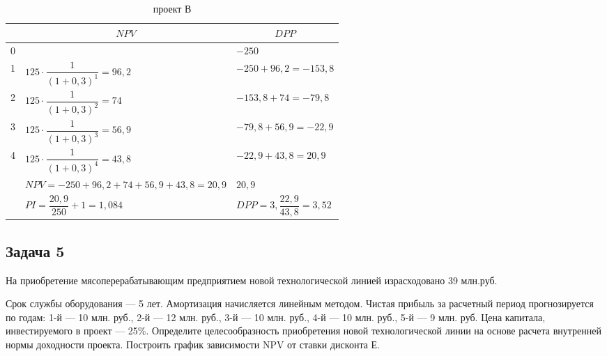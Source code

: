 \begin{table}[!h]
	\caption{проект В}
	\small
	\setlength{\extrarowheight}{2.7mm}
	\begin{tabularx}{\textwidth}{|K{1.55cm}|p{5cm}|p{5cm}|}
		\hline
		&                     &  \\  &                                                                     &  $    -250   $                 \\  & $125 \cdot \dfrac{1}{(1+0,3)^1} = 96,2$ &$ -250 +96,2   =-153,8     $            \\  & $125 \cdot \dfrac{1}{(1+0,3)^2} = 74$    & $-153,8  +74=-79,8      $           \\  & $125 \cdot \dfrac{1}{(1+0,3)^3} = 56,9$ &$-79,8  +56,9=-22,9    $             \\  & $125 \cdot \dfrac{1}{(1+0,3)^4} =43,8$  & $-22,9 +43,8= 20,9     $                \\ \hline
		&$NPV = -250+96,2+74+56,9+43,8=20,9$     & $20,9 $                     \\ \hline
		&$PI = \dfrac{20,9}{250}+1=1,084$               & $DPP = 3,\dfrac{22,9}{43,8}=3,52$                 \\ \hline
	\end{tabularx}
\end{table}








\subsection{Задача 5}
На приобретение мясоперерабатывающим предприятием новой технологической линией израсходовано 39 млн.руб.

Срок службы оборудования --- 5 лет. Амортизация начисляется линейным методом. Чистая прибыль за расчетный период прогнозируется по годам: 1-й --- 10 млн. руб., 2-й --- 12 млн. руб., 3-й --- 10 млн. руб., 4-й --- 10 млн. руб., 5-й --- 9 млн. руб. Цена капитала, инвестируемого в проект --- 25\%. Определите целесообразность приобретения новой  технологической линии на основе расчета внутренней нормы доходности проекта. Построить график зависимости NPV от ставки дисконта Е.